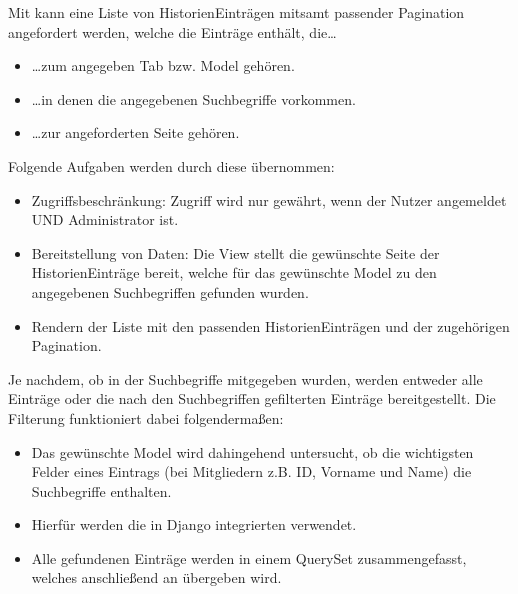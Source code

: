 \documentclass[letterpaper,10pt,english]{sphinxmanual}
\begin{document}
\begin{fulllineitems}
\label{\detokenize{masterCodeDoc:historie.views.fetch_entries}}
Mit  kann eine Liste von Historien\sphinxhyphen{}Einträgen mitsamt passender Pagination angefordert werden, welche die Einträge enthält, die…
\begin{itemize}
\item {} 
…zum angegeben Tab bzw. Model gehören.

\item {} 
…in denen die angegebenen Suchbegriffe vorkommen.

\item {} 
…zur angeforderten Seite gehören.

\end{itemize}

Folgende Aufgaben werden durch diese übernommen:
\begin{itemize}
\item {} 
Zugriffsbeschränkung: Zugriff wird nur gewährt, wenn der Nutzer angemeldet UND Administrator ist.

\item {} 
Bereitstellung von Daten: Die View stellt die gewünschte Seite der Historien\sphinxhyphen{}Einträge bereit, welche für das gewünschte Model zu den angegebenen Suchbegriffen gefunden wurden.

\item {} 
Rendern der Liste mit den passenden Historien\sphinxhyphen{}Einträgen und der zugehörigen Pagination.

\end{itemize}

Je nachdem, ob in der  Suchbegriffe mitgegeben wurden, werden entweder alle Einträge oder die nach den Suchbegriffen
gefilterten Einträge bereitgestellt. Die Filterung funktioniert dabei folgendermaßen:
\begin{itemize}
\item {} 
Das gewünschte Model wird dahingehend untersucht, ob die wichtigsten Felder eines Eintrags (bei Mitgliedern z.B. ID, Vorname und Name) die Suchbegriffe enthalten.

\item {} 
Hierfür werden die in Django integrierten  verwendet.

\item {} 
Alle gefundenen Einträge werden in einem QuerySet zusammengefasst, welches anschließend an  übergeben wird.


\end{itemize}
\end{fulllineitems}
\end{document}
